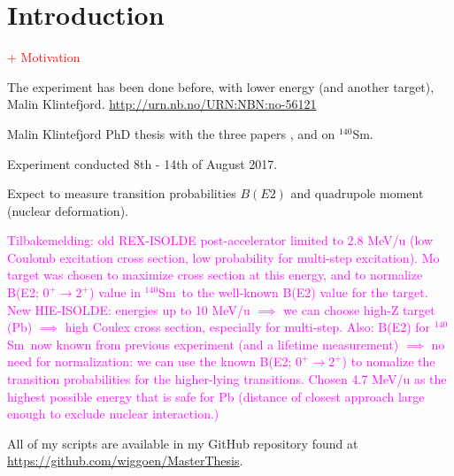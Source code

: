 \documentclass[twoside,english]{uiofysmaster/uiofysmaster}
\newcommand{\Sm}{$^{140}$Sm} %
\begin{document}
\chapter{Introduction}
\textcolor{red}{+ Motivation}


The experiment has been done before, with lower energy (and another target), Malin Klintefjord. \url{http://urn.nb.no/URN:NBN:no-56121} \newline
 
Malin Klintefjord PhD thesis \cite{Klintefjord} with the three papers \cite{Klintefjord2015}, \cite{Samorajczyk2015} and \cite{Klintefjord2016} on \Sm.
 
\bigskip
 
Experiment conducted 8th - 14th of August 2017.

\bigskip

Expect to measure transition probabilities $B(E2)$ and quadrupole moment (nuclear deformation). 

\bigskip

\textcolor{Magenta}{Tilbakemelding: \newline 
old REX-ISOLDE post-accelerator limited to 2.8 MeV/u (low Coulomb excitation cross section, low probability for multi-step excitation). Mo target was chosen to maximize cross section at this energy, and to normalize B(E2; $0^+ \rightarrow 2^+$) value in \Sm\ to the well-known B(E2) value for the target. \newline
New HIE-ISOLDE: energies up to 10 MeV/u $\implies$ we can choose high-Z target (Pb) $\implies$ high Coulex cross section, especially for multi-step. Also: B(E2) for \Sm\ now known from previous experiment (and a lifetime measurement) $\implies$ no need for normalization: we can use the known B(E2; $0^+ \rightarrow 2^+$) to nomalize the transition probabilities for the higher-lying transitions. Chosen 4.7 MeV/u as the highest possible energy that is safe for Pb (distance of closest approach large enough to exclude nuclear interaction.)} \newline


All of my scripts are available in my GitHub repository found at \\ \url{https://github.com/wiggoen/MasterThesis}.

\end{document}
